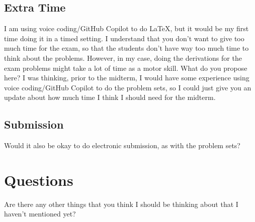 \documentclass[12pt]{article}
\begin{document}
\subsection{Extra Time}
I am using voice coding/GitHub Copilot to do LaTeX, but it would be my first time doing it in a timed setting. I understand that you don't want to give too much time for the exam, so that the students don't have way too much time to think about the problems. However, in my case, doing the derivations for the exam problems might take a lot of time as a motor skill. What do you propose here? I was thinking, prior to the midterm, I would have some experience using voice coding/GitHub Copilot to do the problem sets, so I could just give you an update about how much time I think I should need for the midterm.
\subsection{Submission}
Would it also be okay to do electronic submission, as with the problem sets?
\section{Questions}
Are there any other things that you think I should be thinking about that I haven't mentioned yet?
\end{document}
